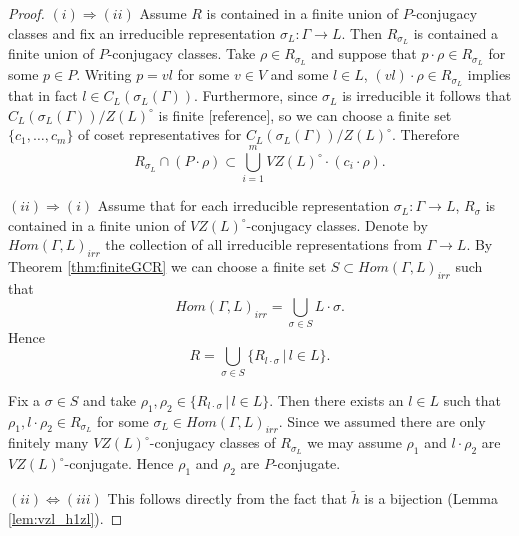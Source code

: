 \begin{proof}\quad

  $(i) \Rightarrow (ii)$ Assume $R$ is contained in a finite union of $P$-conjugacy classes and fix an irreducible representation $\sigma_L : \Gamma \rightarrow L$. Then $R_{\sigma_L}$ is contained a finite union of $P$-conjugacy classes. Take $\rho \in R_{\sigma_L}$ and suppose that $p \cdot \rho \in R_{\sigma_L}$ for some $p \in P$. Writing $p = vl$ for some $v \in V$ and some $l \in L$, $(vl) \cdot \rho \in R_{\sigma_L}$ implies that in fact $l \in C_L(\sigma_L(\Gamma))$. Furthermore, since $\sigma_L$ is irreducible it follows that $C_L(\sigma_L(\Gamma))/Z(L)^\circ$ is finite [reference], so we can choose a finite set $\{c_1, \ldots, c_m\}$ of coset representatives for $C_L(\sigma_L(\Gamma))/Z(L)^\circ$. Therefore
  \begin{displaymath}
    R_{\sigma_L} \cap (P \cdot \rho) \subset \bigcup_{i = 1}^{m} VZ(L)^\circ \cdot \left( c_i \cdot \rho \right).
  \end{displaymath}

  $(ii) \Rightarrow (i)$ Assume that for each irreducible representation $\sigma_L : \Gamma \rightarrow L$, $R_{\sigma}$ is contained in a finite union of $VZ(L)^\circ$-conjugacy classes. Denote by $Hom(\Gamma, L)_{irr}$ the collection of all irreducible representations from $\Gamma \rightarrow L$. By Theorem \ref{thm:finiteGCR} we can choose a finite set $S \subset Hom(\Gamma, L)_{irr}$ such that
  \begin{displaymath}
    Hom(\Gamma, L)_{irr} = \bigcup_{\sigma \in S} L \cdot \sigma.
  \end{displaymath}
  Hence 
  \begin{displaymath}
    R = \bigcup_{\sigma \in S} \{R_{l \cdot \sigma} \,|\, l \in L \}.
  \end{displaymath}

  Fix a $\sigma \in S$ and take $\rho_1, \rho_2 \in \{R_{l \cdot \sigma} \,|\, l \in L\}$. Then there exists an $l \in L$ such that $\rho_1, l \cdot \rho_2 \in R_{\sigma_L}$ for some $\sigma_L \in Hom(\Gamma, L)_{irr}$. Since we assumed there are only finitely many $VZ(L)^\circ$-conjugacy classes of $R_{\sigma_L}$ we may assume $\rho_1$ and $l \cdot \rho_2$ are $VZ(L)^\circ$-conjugate. Hence $\rho_1$ and $\rho_2$ are $P$-conjugate.

  $(ii) \Leftrightarrow (iii)$ This follows directly from the fact that $\tilde{h}$ is a bijection (Lemma \ref{lem:vzl_h1zl}).

\end{proof}

